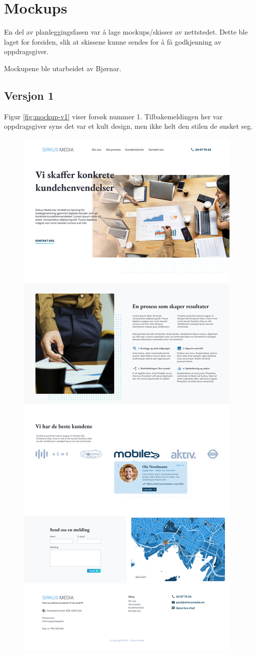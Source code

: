 \section{Mockups}
En del av planleggingsfasen var å lage mockups/skisser av nettstedet. Dette ble laget for forsiden, slik at skissene kunne sendes for å få godkjenning av oppdragsgiver.

Mockupene ble utarbeidet av Bjørnar. 

\subsection{Versjon 1}
Figur \ref{fig:mockup-v1} viser forsøk nummer 1. Tilbakemeldingen her var oppdragsgiver syns det var et kult design, men ikke helt den stilen de ønsket seg.
\begin{figure}[H]
    \centering
    \includegraphics[height=\textheight]{mockup1-draft3.png}

\end{figure}
